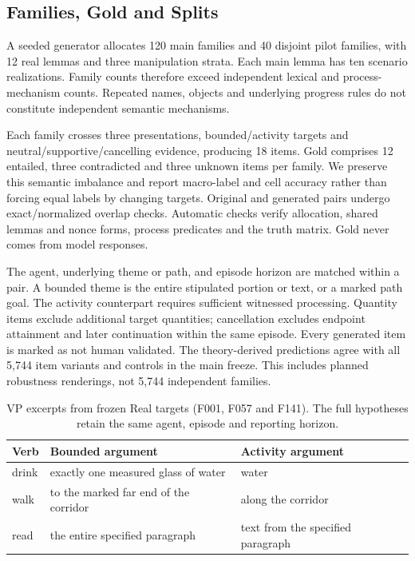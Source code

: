 \documentclass[sigconf,anonymous,review]{acmart}
\begin{document}
\subsection{Families, Gold and Splits}
A seeded generator allocates 120 main families and 40 disjoint pilot families, with 12 real lemmas and three manipulation strata. Each main lemma has ten scenario realizations. Family counts therefore exceed independent lexical and process-mechanism counts. Repeated names, objects and underlying progress rules do not constitute independent semantic mechanisms.

Each family crosses three presentations, bounded/activity targets and neutral/supportive/cancelling evidence, producing 18 items. Gold comprises 12 entailed, three contradicted and three unknown items per family. We preserve this semantic imbalance and report macro-label and cell accuracy rather than forcing equal labels by changing targets. Original and generated pairs undergo exact/normalized overlap checks. Automatic checks verify allocation, shared lemmas and nonce forms, process predicates and the truth matrix. Gold never comes from model responses.

The agent, underlying theme or path, and episode horizon are matched within a pair. A bounded theme is the entire stipulated portion or text, or a marked path goal. The activity counterpart requires sufficient witnessed processing. Quantity items exclude additional target quantities; cancellation excludes endpoint attainment and later continuation within the same episode. Every generated item is marked as not human validated. The theory-derived predictions agree with all 5,744 item variants and controls in the main freeze. This includes planned robustness renderings, not 5,744 independent families.

\begin{table}[t]
\centering
\caption{VP excerpts from frozen Real targets (F001, F057 and F141). The full hypotheses retain the same agent, episode and reporting horizon.}
\label{tab:vp_examples}
\setlength{\tabcolsep}{3pt}
\begin{tabular}{@{}l>{\raggedright\arraybackslash}p{}>{\raggedright\arraybackslash}p{}@{}}
\toprule
Verb & Bounded argument & Activity argument\\
\midrule
drink & exactly one measured glass of water & water\\
walk & to the marked far end of the corridor & along the corridor\\
read & the entire specified paragraph & text from the specified paragraph\\
\bottomrule
\end{tabular}
\end{table}
\end{document}
